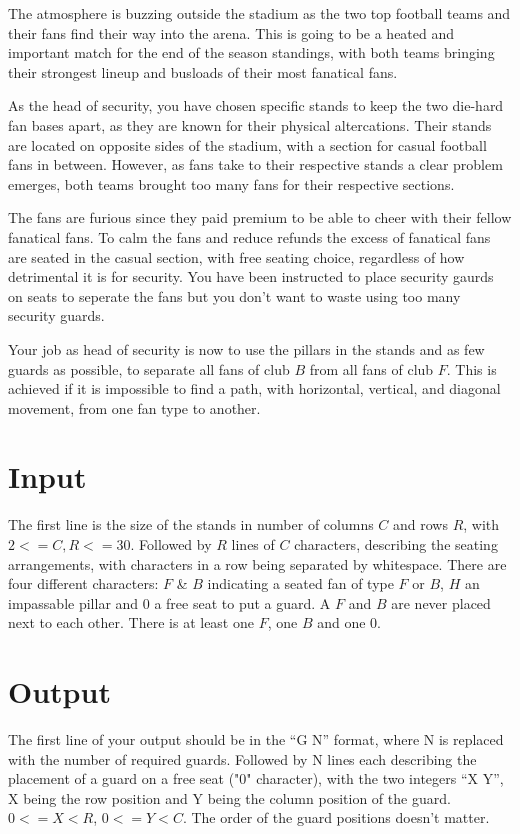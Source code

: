 


\noindent
The atmosphere is buzzing outside the stadium as the two top football teams and their fans find their
way into the arena. This is going to be a heated and important match for the end of the season
standings, with both teams bringing their strongest lineup and busloads of their most fanatical fans.


\noindent
As the head of security, you have chosen specific stands to keep the two die-hard fan bases apart,
as they are known for their physical altercations. Their stands are located on opposite sides of the
stadium, with a section for casual football fans in between. However, as fans take to their respective
stands a clear problem emerges, both teams brought too many fans for their respective sections.

\noindent
The fans are furious since they paid premium to be able to cheer with their fellow fanatical fans.
To calm the fans and reduce refunds the excess of fanatical fans are seated in the casual section, with
free seating choice, regardless of how detrimental it is for security. You have been instructed to place
security gaurds on seats to seperate the fans but you don't want to waste using too many security guards.

\noindent
Your job as head of security is now to use the pillars in the stands and as few guards as possible, to separate all fans of club $B$ from all fans of club $F$. This is achieved if it is impossible to find a path, with horizontal, vertical, and diagonal movement, from one fan type to another.

\section*{Input}

The first line is the size of the stands in number of columns $C$ and rows $R$, with $2 <= C,R <= 30$.
Followed by $R$ lines of $C$ characters, describing the seating arrangements, with characters 
in a row being separated by whitespace. There are four different characters: $F$ \& $B$ indicating a seated 
fan of type $F$ or $B$, $H$ an impassable pillar and $0$ a free seat to put a guard.
A $F$ and $B$ are never placed next to each other. There is at least one $F$, one $B$ and one $0$.

\section*{Output}

The first line of your output should be in the “G N” format, where N is replaced with the number of required guards.
Followed by N lines each describing the placement of a guard on a free seat ("0" character), with the two integers “X Y”, X being the row 
position and Y being the column position of the guard. $0 <= X < R$, $0 <= Y < C$. The order of the 
guard positions doesn't matter.

